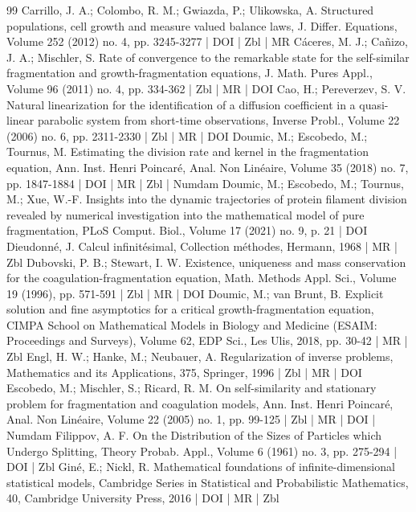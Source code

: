 \begin{thebibliography}{99}
Carrillo, J. A.; Colombo, R. M.; Gwiazda, P.; Ulikowska, A. Structured populations, cell growth and measure valued balance laws, J. Differ. Equations, Volume 252 (2012) no. 4, pp. 3245-3277 | DOI | Zbl | MR
Cáceres, M. J.; Cañizo, J. A.; Mischler, S. Rate of convergence to the remarkable state for the self-similar fragmentation and growth-fragmentation equations, J. Math. Pures Appl., Volume 96 (2011) no. 4, pp. 334-362 | Zbl | MR | DOI
Cao, H.; Pereverzev, S. V. Natural linearization for the identification of a diffusion coefficient in a quasi-linear parabolic system from short-time observations, Inverse Probl., Volume 22 (2006) no. 6, pp. 2311-2330 | Zbl | MR | DOI
Doumic, M.; Escobedo, M.; Tournus, M. Estimating the division rate and kernel in the fragmentation equation, Ann. Inst. Henri Poincaré, Anal. Non Linéaire, Volume 35 (2018) no. 7, pp. 1847-1884 | DOI | MR | Zbl | Numdam
Doumic, M.; Escobedo, M.; Tournus, M.; Xue, W.-F. Insights into the dynamic trajectories of protein filament division revealed by numerical investigation into the mathematical model of pure fragmentation, PLoS Comput. Biol., Volume 17 (2021) no. 9, p. 21 | DOI
Dieudonné, J. Calcul infinitésimal, Collection méthodes, Hermann, 1968 | MR | Zbl
Dubovski, P. B.; Stewart, I. W. Existence, uniqueness and mass conservation for the coagulation-fragmentation equation, Math. Methods Appl. Sci., Volume 19 (1996), pp. 571-591 | Zbl | MR | DOI
Doumic, M.; van Brunt, B. Explicit solution and fine asymptotics for a critical growth-fragmentation equation, CIMPA School on Mathematical Models in Biology and Medicine (ESAIM: Proceedings and Surveys), Volume 62, EDP Sci., Les Ulis, 2018, pp. 30-42 | MR | Zbl
Engl, H. W.; Hanke, M.; Neubauer, A. Regularization of inverse problems, Mathematics and its Applications, 375, Springer, 1996 | Zbl | MR | DOI
Escobedo, M.; Mischler, S.; Ricard, R. M. On self-similarity and stationary problem for fragmentation and coagulation models, Ann. Inst. Henri Poincaré, Anal. Non Linéaire, Volume 22 (2005) no. 1, pp. 99-125 | Zbl | MR | DOI | Numdam
Filippov, A. F. On the Distribution of the Sizes of Particles which Undergo Splitting, Theory Probab. Appl., Volume 6 (1961) no. 3, pp. 275-294 | DOI | Zbl
Giné, E.; Nickl, R. Mathematical foundations of infinite-dimensional statistical models, Cambridge Series in Statistical and Probabilistic Mathematics, 40, Cambridge University Press, 2016 | DOI | MR | Zbl

\end{thebibliography}

